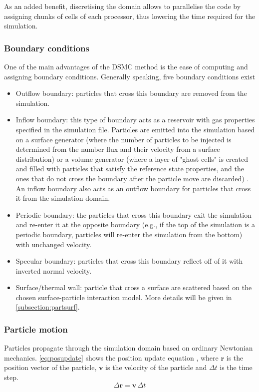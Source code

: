 As an added benefit, discretising the domain allows to parallelise the code by assigning chunks of cells of each processor, thus lowering the time required for the simulation.

\subsubsection{Boundary conditions}
One of the main advantages of the DSMC method is the ease of computing and assigning boundary conditions. Generally speaking, five boundary conditions exist \cite{natodsmc, spartadoc}
\begin{itemize}
    \item Outflow boundary: particles that cross this boundary are removed from the simulation.
    \item Inflow boundary: this type of boundary acts as a reservoir with gas properties specified in the simulation file. Particles are emitted into the simulation based on a surface generator (where the number of particles to be injected is determined from the number flux and their velocity from a surface distribution) or a volume generator (where a layer of "ghost cells" is created and filled with particles that satisfy the reference state properties, and the ones that do not cross the boundary after the particle move are discarded) \cite{natodsmc}. An inflow boundary also acts as an outflow boundary for particles that cross it from the simulation domain.
    \item Periodic boundary: the particles that cross this boundary exit the simulation and re-enter it at the opposite boundary (e.g., if the top of the simulation is a periodic boundary, particles will re-enter the simulation from the bottom) with unchanged velocity.
    \item Specular boundary: particles that cross this boundary reflect off of it with inverted normal velocity.
    \item Surface/thermal wall: particle that cross a surface are scattered based on the chosen surface-particle interaction model. More details will be given in \autoref{subsection:partsurf}.
\end{itemize}

\subsubsection{Particle motion}
Particles propagate through the simulation domain based on ordinary Newtonian mechanics. \autoref{eq:posupdate} shows the position update equation \cite{bird}, where $\mathbf{r}$ is the position vector of the particle, $\mathbf{v}$ is the velocity of the particle and $\Delta{t}$ is the time step.
\begin{equation}
    \Delta{\mathbf{r}} = \mathbf{v}\, \Delta{t}
    \label{eq:posupdate}
\end{equation}

